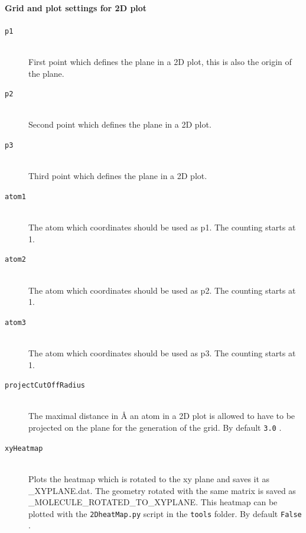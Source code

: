 \documentclass[bibliography=totocnumbered,a4paper,10pt,oneside]{scrbook}
\newcommand{\ttt}[1]{%
  \begingroup\setlength{\fboxsep}{1pt}%
  \colorbox{serenity-green!30}{\texttt{\hspace*{2pt}\vphantom{(g}#1\hspace*{2pt}}}%
  \endgroup
}
\begin{document}
\paragraph{Grid and plot settings for 2D plot}
\begin{description}
    \item [\texttt{p1}]\hfill \\
    First point which defines the plane in a 2D plot, this is also the origin of the plane.
    \item [\texttt{p2}]\hfill \\
    Second point which defines the plane in a 2D plot.
    \item [\texttt{p3}]\hfill \\
    Third point which defines the plane in a 2D plot.
    \item [\texttt{atom1}]\hfill \\
    The atom which coordinates should be used as p1. The counting starts at 1.
    \item [\texttt{atom2}]\hfill \\
    The atom which coordinates should be used as p2. The counting starts at 1.
    \item [\texttt{atom3}]\hfill \\
    The atom which coordinates should be used as p3. The counting starts at 1.
    \item [\texttt{projectCutOffRadius}]\hfill \\
    The maximal distance in \AA{} an atom in a 2D plot is allowed to have to be projected on the plane for the generation of the grid. By default \ttt{3.0}.
    \item [\texttt{xyHeatmap}]\hfill \\
    Plots the heatmap which is rotated to the xy plane and saves it as \_XYPLANE.dat. The geometry rotated with the same matrix is saved as \_MOLECULE\_ROTATED\_TO\_XYPLANE.
    This heatmap can be plotted with the \texttt{2DheatMap.py} script in the \texttt{tools} folder. By default \ttt{False}.
\end{description}
\end{document}
